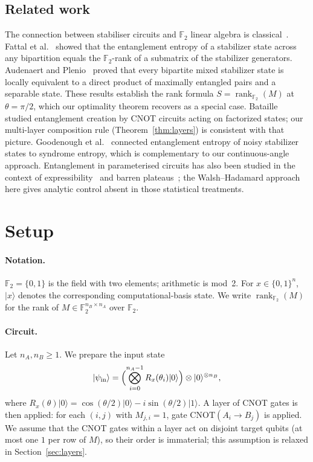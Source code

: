 \documentclass[11pt,a4paper]{article}
\newcommand{\F}{\mathbb{F}}
\newcommand{\rk}{\operatorname{rank}_{\F_2}}
\newcommand{\VNE}{S}
\begin{document}
\subsection*{Related work}

The connection between stabiliser circuits and $\F_2$ linear algebra is
classical~\cite{gottesman1997stabilizer}.  Fattal et
al.~\cite{fattal2004entanglement} showed that the entanglement entropy of a
stabilizer state across any bipartition equals the $\F_2$-rank of a submatrix
of the stabilizer generators.  Audenaert and
Plenio~\cite{audenaert2005entanglement} proved that every bipartite mixed
stabilizer state is locally equivalent to a direct product of maximally
entangled pairs and a separable state.  These results establish the rank
formula $\VNE = \rk(M)$ at $\theta = \pi/2$, which our optimality theorem
recovers as a special case.  Bataille~\cite{bataille2022cnot} studied
entanglement creation by CNOT circuits acting on factorized states; our
multi-layer composition rule (Theorem~\ref{thm:layers}) is consistent with
that picture.  Goodenough et al.~\cite{goodenough2024stabilizer} connected
entanglement entropy of noisy stabilizer states to syndrome entropy, which is
complementary to our continuous-angle approach.  Entanglement in parameterised
circuits has also been studied in the context of
expressibility~\cite{sim2019expressibility} and barren
plateaus~\cite{mcclean2018barren}; the Walsh--Hadamard approach here gives
analytic control absent in those statistical treatments.

\section{Setup}
\label{sec:prelim}

\paragraph{Notation.}
$\F_2 = \{0,1\}$ is the field with two elements; arithmetic is mod~2.
For $x \in \{0,1\}^n$, $|x\rangle$ denotes the corresponding
computational-basis state.  We write $\rk(M)$ for the rank of
$M \in \F_2^{n_B \times n_A}$ over $\F_2$.

\paragraph{Circuit.}
Let $n_A, n_B \geq 1$.  We prepare the input state
\begin{equation}
  |\psi_{\mathrm{in}}\rangle
  = \Bigl(\bigotimes_{i=0}^{n_A-1} R_x(\theta_i)|0\rangle\Bigr)
    \otimes |0\rangle^{\otimes n_B},
  \label{eq:input}
\end{equation}
where $R_x(\theta)|0\rangle = \cos(\theta/2)|0\rangle - i\sin(\theta/2)|1\rangle$.
A layer of CNOT gates is then applied: for each $(i,j)$ with $M_{j,i}=1$,
gate $\mathrm{CNOT}(A_i \to B_j)$ is applied.  We assume that the CNOT
gates within a layer act on disjoint target qubits (at most one $1$ per row
of $M$), so their order is immaterial; this assumption is relaxed in
Section~\ref{sec:layers}.
\end{document}
